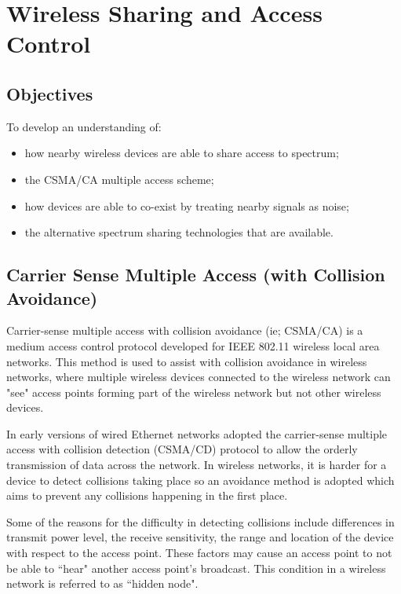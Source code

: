 \chapter{Wireless Sharing and Access Control}\label{waccess}

\minitoc 

\clearpage
\section*{Objectives}
To develop an understanding of:
\begin{itemize}

\item how nearby wireless devices are able to share access to spectrum;

\item the CSMA/CA multiple access scheme;

\item how devices are able to co-exist by treating nearby signals as noise;

\item the alternative spectrum sharing technologies that are available.

\end{itemize}

\section{Carrier Sense Multiple Access (with Collision Avoidance)}\label{CSMA/CA}

Carrier-sense multiple access with collision avoidance (ie; CSMA/CA) is a
medium access control protocol developed for IEEE 802.11 wireless local
area networks.  This method is used to assist with collision avoidance
in wireless networks, where multiple wireless devices connected to the
wireless network can "see" access points forming part of the wireless
network but not other wireless devices.

In early versions of wired Ethernet networks adopted the carrier-sense
multiple access with collision detection (CSMA/CD) protocol to allow the
orderly transmission of data across the network. In wireless networks, it
is harder for a device to detect collisions taking place so an
avoidance method is adopted which aims to prevent any collisions
happening in the first place.

Some of the reasons for the difficulty in detecting collisions include
differences in transmit power level, the receive sensitivity, the
range and location of the device with respect to the access point. These
factors may cause an access point to not be able to ``hear" another access
point's broadcast. This condition in a wireless network is referred to as
``hidden node".

